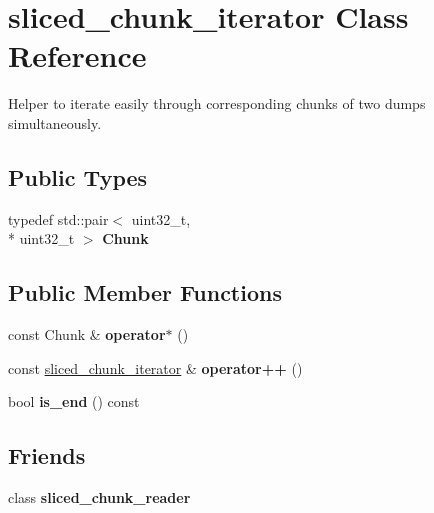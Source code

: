 \hypertarget{classsliced__chunk__iterator}{\section{sliced\+\_\+chunk\+\_\+iterator Class Reference}
\label{classsliced__chunk__iterator}
}


Helper to iterate easily through corresponding chunks of two dumps simultaneously.  


\subsection*{Public Types}
\begin{DoxyCompactItemize}
\item 
\hypertarget{classsliced__chunk__iterator_aeaf18784dc49d3c52f9a04c0d075ce7e}{typedef std\+::pair$<$ uint32\+\_\+t, \\*
uint32\+\_\+t $>$ {\bfseries Chunk}}\label{classsliced__chunk__iterator_aeaf18784dc49d3c52f9a04c0d075ce7e}

\end{DoxyCompactItemize}
\subsection*{Public Member Functions}
\begin{DoxyCompactItemize}
\item 
\hypertarget{classsliced__chunk__iterator_a5a087232e49892f537d9c46c9dccfdf3}{const Chunk \& {\bfseries operator$\ast$} ()}\label{classsliced__chunk__iterator_a5a087232e49892f537d9c46c9dccfdf3}

\item 
\hypertarget{classsliced__chunk__iterator_af5de139fb80af9334c32b7be87850578}{const \hyperlink{classsliced__chunk__iterator}{sliced\+\_\+chunk\+\_\+iterator} \& {\bfseries operator++} ()}\label{classsliced__chunk__iterator_af5de139fb80af9334c32b7be87850578}

\item 
\hypertarget{classsliced__chunk__iterator_acaffd055e49c9b93e4eac7f416bf9e18}{bool {\bfseries is\+\_\+end} () const }\label{classsliced__chunk__iterator_acaffd055e49c9b93e4eac7f416bf9e18}

\end{DoxyCompactItemize}
\subsection*{Friends}
\begin{DoxyCompactItemize}
\item 
\hypertarget{classsliced__chunk__iterator_afa3d8f2267c2846ebab0e345663ee764}{class {\bfseries sliced\+\_\+chunk\+\_\+reader}}\label{classsliced__chunk__iterator_afa3d8f2267c2846ebab0e345663ee764}

\end{DoxyCompactItemize}


